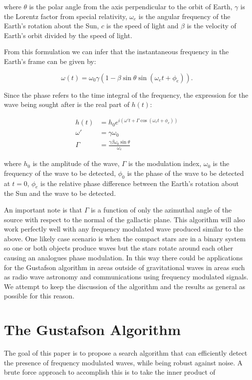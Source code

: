 \documentclass[onecolumn, groupedaddress, 10pt]{revtex4-1}
\begin{document}
where $\theta$ is the polar angle from the axis perpendicular to the orbit of Earth, $\gamma$ is the Lorentz factor from special relativity, $\omega_e$ is the angular frequency of the Earth's rotation about the Sun, $c$ is the speed of light and $\beta$ is the velocity of Earth's orbit divided by the speed of light.

From this formulation we can infer that the instantaneous frequency in the Earth's frame can be given by:

\begin{equation}
\omega (t) = \omega_0 \gamma \left( 1 - \beta \sin \theta \sin (\omega_e t + \phi_e) \right). 
\end{equation}

Since the phase refers to the time integral of the frequency, the expression for the wave being sought after is the real part of $h(t)$: 

\begin{align}
h(t)    &= h_0 e^{i \left( \omega' t + \Gamma \cos (\omega_e t + \phi_e) \right)}		\\
\omega' &= \gamma \omega_0															\\
\Gamma  &= \frac{\gamma \beta \omega_0 \sin \theta}{\omega_e}
\end{align}


where $h_0$ is the amplitude of the wave, $\Gamma$ is the modulation index, $\omega_0$ is the frequency of the wave to be detected, $\phi_0$ is the phase of the wave to be detected at $t=0$, $\phi_e$ is the relative phase difference between the Earth's rotation about the Sun and the wave to be detected.

An important note is that $\Gamma$ is a function of only the azimuthal angle of the source with respect to the normal of the gallactic plane. This algorithm will also work perfectly well with any frequency modulated wave produced similar to the above. One likely case scenario is when the compact stars are in a binary system so one or both objects produce waves but the stars rotate around each other causing an analogues phase modulation.  In this way there could be applications for the Gustafson algorithm in areas outside of gravitational waves in areas such as radio wave astronomy and communications using frequency modulated signals. We attempt to keep the discussion of the algorithm and the results as general as possible for this reason.

\section{The Gustafson Algorithm}
The goal of this paper is to propose a search algorithm that can efficiently detect the presence of frequency modulated waves, while being robust against noise.  A brute force approach to accomplish this is to take the inner product of 
\end{document}
